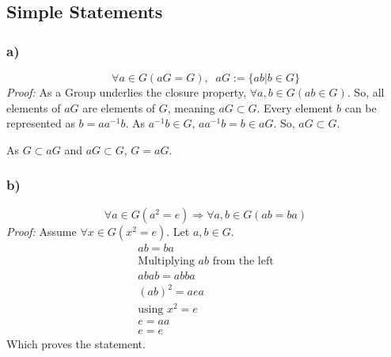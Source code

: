 \documentclass[]{scrartcl}
\begin{document}
\subsection{Simple Statements}
\subsubsection{a)}
$$
\forall a\in G(aG = G),\;\; aG := \{ab|b\in G\}
$$
\textit{Proof: }
As a Group underlies the closure property, $\forall a,b \in G(ab\in G)$. So, all elements of $aG$ are elements of $G$, meaning $aG\subset G$. Every element $b$ can be represented as $b = aa^{-1}b$. As $a^{-1}b\in G$, $aa^{-1}b = b \in aG$. So, $aG \subset G$.

As $G \subset aG$ and $aG \subset G$, $G = aG$.
\subsubsection{b)}
$$
\forall a\in G(a^2 = e) \Rightarrow \forall a,b \in G(ab = ba)
$$
\textit{Proof: }Assume $\forall x\in G(x^2 = e)$. Let $a,b \in G$.
\begin{gather}
	ab = ba\\
	\text{Multiplying $ab$ from the left}\nonumber\\
	abab = abba\\
	(ab)^2 = aea\\
	\text{using $x^2 = e$}\nonumber\\
	e = aa\\
	e = e
\end{gather}
Which proves the statement.
\end{document}
